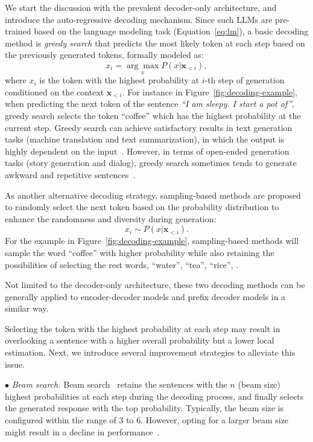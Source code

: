  We start the discussion with the prevalent decoder-only architecture, and introduce the auto-regressive decoding mechanism.  Since such LLMs are pre-trained based on the  language modeling task (Equation~\ref{eq:lm}), a basic decoding method is \emph{greedy search} that predicts the most likely token at each step based on the previously generated tokens, formally modeled as:
\begin{equation}
{ x_i = \underset{x}{\arg\max} P(x |\mathbf{x}_{<i}),}
\end{equation}
where $x_i$ is the token with the highest probability at $i$-th step of generation conditioned on the context $\mathbf{x}_{<i}$. For instance in Figure~\ref{fig:decoding-example}, when predicting the next token of the sentence \emph{``I am sleepy. I start a pot of''}, greedy search selects the token ``coffee'' which has the highest probability at the current step. Greedy search can achieve satisfactory results in  text generation tasks (\eg machine translation and text summarization), in which  the output is highly dependent on the input~\cite{Murray-WMT-2018-Correcting}. However, in terms of open-ended generation tasks (\eg story generation and dialog), greedy search sometimes tends to generate awkward and repetitive sentences~\cite{Holtzman-2020-ICLR-The}.


As another alternative decoding strategy, sampling-based methods are proposed to randomly select the next token based on the probability distribution to enhance the randomness and diversity during generation:
\begin{equation}
    x_i \sim P(x|\mathbf{x}_{<i}).
\end{equation} 
For the example in  Figure~\ref{fig:decoding-example}, sampling-based methods will sample the word ``coffee'' with higher probability while also retaining the possibilities of selecting the rest words, ``water'', ``tea'', ``rice'', \etc.



Not limited to the decoder-only architecture, these two decoding methods can be generally applied to encoder-decoder models and prefix decoder models in a similar way.   


Selecting the token with the highest probability at each step may result in overlooking a sentence with a higher overall probability but a lower local estimation. Next, we introduce several improvement strategies  to alleviate this issue.

$\bullet$ \emph{Beam search.} 
Beam search~\cite{CMU-book-1977-speech} retains the sentences with the $n$ (beam size) highest probabilities at each step during the decoding process, and finally selects the generated response with the top probability. Typically, the beam size is configured within the range of 3 to 6. However, opting for a larger beam size might result in a decline in performance~\cite{Koehn-ACL-2017-Six}.


